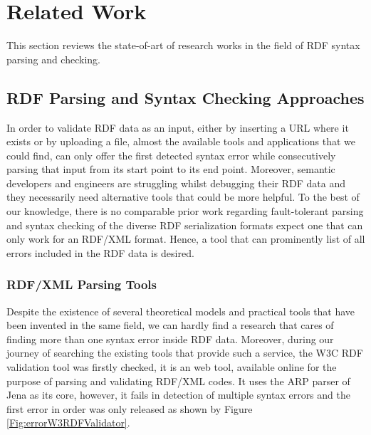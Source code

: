 \chapter{Related Work}
\label{ch:related}


This section reviews the state-of-art of research works in the field of RDF syntax parsing and checking.

\section{RDF Parsing and Syntax Checking Approaches}
In order to validate RDF data as an input, either by inserting a URL where it exists or by uploading a file, almost the available tools and applications that we could find, can only offer the first detected syntax error while consecutively parsing that input from its start point to its end point. Moreover, semantic developers and engineers are struggling whilst debugging their RDF data and they necessarily need alternative tools that could be more helpful. To the best of our knowledge, there is no comparable prior work regarding fault-tolerant parsing and syntax checking of the diverse RDF serialization formats expect one that can only work for an RDF/XML format. Hence, a tool that can prominently list of all errors included in the RDF data is desired.
\subsection{RDF/XML Parsing Tools}

 Despite the existence of  several theoretical models and practical tools that have been invented in the same field, we can hardly find a research that cares of finding more than one syntax error inside RDF data. Moreover, during our journey of searching the existing tools that provide such a service, the W3C RDF validation tool \cite{W3C:Validation:Online} was firstly checked, it is an web tool, available online for the purpose of parsing and validating RDF/XML codes. It uses the ARP parser of Jena \cite{McBride:2002:JSW:613357.613755} as its core, however, it fails in detection of multiple syntax errors and the first error in order was only released as shown by Figure \ref{Fig:errorW3RDFValidator}.
 
